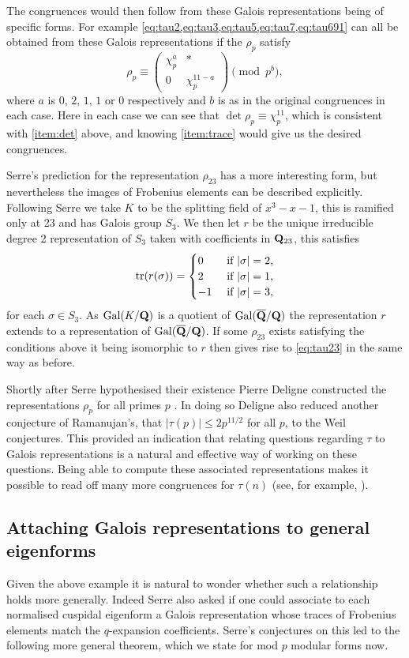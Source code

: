 \documentclass[a4paper,12pt]{article}
\begin{document}
\begin{ex}
The congruences would then follow from these Galois representations being of specific forms.
For example \cref{eq:tau2,eq:tau3,eq:tau5,eq:tau7,eq:tau691} can all be obtained from these Galois representations if the $\rho_p$ satisfy
\[
\rho_p \equiv \begin{pmatrix}
\chi_p^a & * \\
0        & \chi_p^{11-a}
\end{pmatrix}\pmod{p^b},
\]
where $a$ is $0,\,2,\,1,\,1$ or $0$ respectively and $b$ is as in the original congruences in each case.
Here in each case we can see that $\det\rho_p \equiv \chi_p^{11}$, which is consistent with \cref{item:det} above, and knowing \cref{item:trace} would give us the desired congruences.

Serre's prediction for the representation $\rho_{23}$ has a more interesting form, but nevertheless the images of Frobenius elements can be described explicitly.
Following Serre we take $K$ to be the splitting field of $x^3 - x - 1$, this is ramified only at 23 and has Galois group $S_3$.
We then let $r$ be the unique irreducible degree 2 representation of $S_3$ taken with coefficients in $\mathbf{Q}_{23}$, this satisfies
\[
\operatorname{tr}(r(\sigma)) = \begin{cases}
0 &\text{ if } |\sigma| = 2,\\
2 &\text{ if } |\sigma| = 1,\\
-1 &\text{ if } |\sigma| = 3,
\end{cases}
\]
for each $\sigma \in S_3$.
As $\operatorname{Gal}(K/\mathbf{Q})$ is a quotient of $\operatorname{Gal}(\overline{\mathbf{Q}}/\mathbf{Q})$ the representation $r$ extends to a representation of $\operatorname{Gal}(\overline{\mathbf{Q}}/\mathbf{Q})$.
If some $\rho_{23}$ exists satisfying the conditions above it being isomorphic to $r$ then gives rise to \cref{eq:tau23} in the same way as before.

Shortly after Serre hypothesised their existence Pierre Deligne constructed the representations $\rho_p$ for all primes $p$  \cite{Deligne}.
In doing so Deligne also reduced another conjecture of Ramanujan's, that $|\tau(p)| \le 2p^{11/2}$ for all $p$, to the Weil conjectures.
This provided an indication that relating questions regarding $\tau$ to Galois representations is a natural and effective way of working on these questions.
Being able to compute these associated representations makes it possible to read off many more congruences for $\tau(n)$ (see, for example, \cite{Mascot}).
\end{ex}

\subsection{Attaching Galois representations to general eigenforms}
Given the above example it is natural to wonder whether such a relationship holds more generally.
Indeed Serre also asked if one could associate to each normalised cuspidal eigenform a Galois representation whose traces of Frobenius elements match the $q$-expansion coefficients.
Serre's conjectures on this led to the following more general theorem, which we state for mod $p$ modular forms now.
\end{document}
